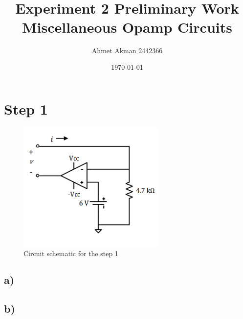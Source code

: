 \documentclass[letterpaper,12pt]{article}
\begin{document}
\title{Experiment 2 Preliminary Work \protect\\ Miscellaneous Opamp Circuits}
\author{Ahmet Akman 2442366 \protect\\}
\date{\today}
\maketitle
\tableofcontents

\section{Step 1}

\begin{figure}[H]
    \centering
    \includegraphics[width=0.65\textwidth]{1SCH.png}
\caption{Circuit schematic for the step 1}
\end{figure} 

\subsection{a)}

\subsection{b)}
\end{document}
